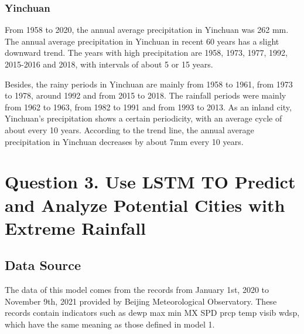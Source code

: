 \documentclass{swmcmthesis}
\begin{document}
\subsubsection{Yinchuan}
\hspace{1.25em}
From 1958 to 2020, the annual average precipitation in Yinchuan was 262 mm. The annual average precipitation in Yinchuan in recent 60 years has a slight downward trend. The years with high precipitation are 1958, 1973, 1977, 1992, 2015-2016 and 2018, with intervals of about 5 or 15 years.
\par 
Besides, the rainy periods in Yinchuan are mainly from 1958 to 1961, from 1973 to 1978, around 1992 and from 2015 to 2018. The rainfall periods were mainly from 1962 to 1963, from 1982 to 1991 and from 1993 to 2013. As an inland city, Yinchuan's precipitation shows a certain periodicity, with an average cycle of about every 10 years. According to the trend line, the annual average precipitation in Yinchuan decreases by about 7mm every 10 years.
\section{Question 3. Use LSTM TO Predict and Analyze Potential Cities with Extreme Rainfall}
\subsection{Data Source}
\hspace{1.25em}
The data of this model comes from the records from January 1st, 2020 to November 9th, 2021 provided by Beijing Meteorological Observatory. These records contain indicators such as dewp max min MX SPD prcp temp visib wdsp, which have the same meaning as those defined in model 1.
\end{document}
